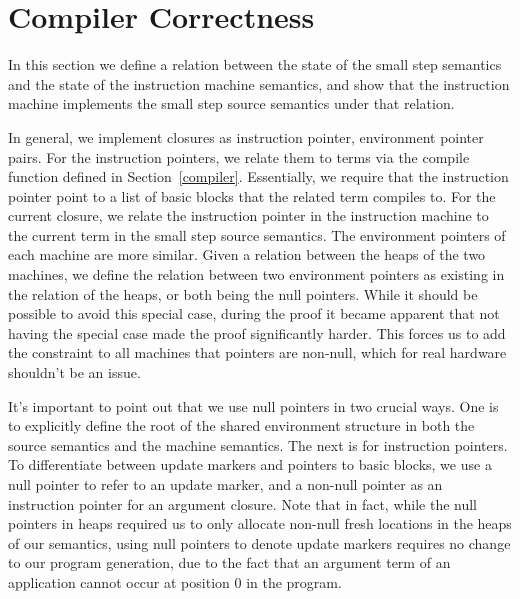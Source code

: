 \section{Compiler Correctness} \label{sec:correctness}

In this section we define a relation between the state of the small step
semantics and the state of the instruction machine semantics, and show that the
instruction machine implements the small step source semantics under that
relation. 

In general, we implement closures as instruction pointer, environment pointer
pairs. For the instruction pointers, we relate them to terms via the compile
function defined in Section~\ref{compiler}. Essentially, we require that the
instruction pointer point to a list of basic blocks that the related term
compiles to. For the current closure, we relate the instruction pointer in the
instruction machine to the current term in the small step source semantics. The
environment pointers of each machine are more similar. Given a relation between
the heaps of the two machines, we define the relation between two environment
pointers as existing in the relation of the heaps, or both being the null
pointers. While it should be possible to avoid this special case, during the
proof it became apparent that not having the special case made the proof
significantly harder. This forces us to add the constraint to all machines that
pointers are non-null, which for real hardware shouldn't be an issue.  

It's important to point out that we use null pointers in two crucial ways. One
is to explicitly define the root of the shared environment structure in both the
source semantics and the machine semantics. The next is for instruction
pointers. To differentiate between update markers and pointers to basic blocks,
we use a null pointer to refer to an update marker, and a non-null pointer as an
instruction pointer for an argument closure. Note that in fact, while the null
pointers in heaps required us to only allocate non-null fresh locations in the
heaps of our semantics, using null pointers to denote update markers requires no
change to our program generation, due to the fact that an argument term of an
application cannot occur at position 0 in the program.

